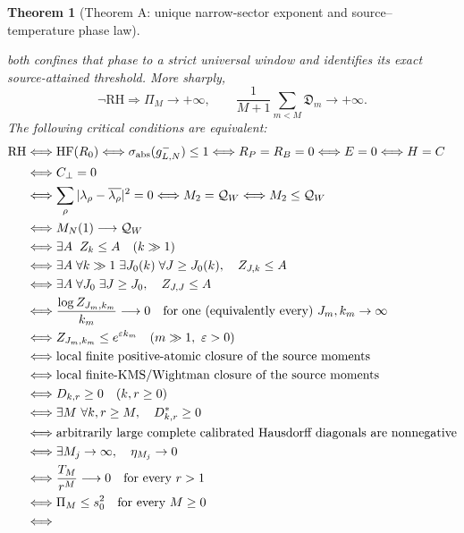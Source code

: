 \documentclass[11pt]{article}
\newtheorem{theorem}{Theorem}[section]
\begin{document}
\begin{theorem}[Theorem A: unique narrow-sector exponent and source--temperature phase law]
\begin{enumerate}[label=\textup{(\roman*)}]
both confines that phase to a strict universal window and identifies its exact source-attained
threshold.  More sharply,
\[
 \neg\mathrm{RH}\Longrightarrow
 \Pi_M\longrightarrow+\infty,
 \qquad
 \frac1{M+1}\sum_{m<M}\mathfrak D_m\longrightarrow+\infty.
 \tag{1.20zb}
\]
The following critical conditions are equivalent:
\[
 \begin{aligned}
 \mathrm{RH}
 &\Longleftrightarrow \mathrm{HF}(R_0)
 \Longleftrightarrow \sigma_{\rm abs}(g_{L,N}^-)\le1
 \Longleftrightarrow R_P=R_B=0
 \Longleftrightarrow E=0
 \Longleftrightarrow H=C\\
 &\Longleftrightarrow C_\perp=0\\
 &\Longleftrightarrow
 \sum_\rho|\lambda_\rho-\overline{\lambda_\rho}|^2=0
 \Longleftrightarrow M_2=\mathcal Q_W
 \Longleftrightarrow M_2\le\mathcal Q_W\\
 &\Longleftrightarrow M_N(1)\longrightarrow\mathcal Q_W\\
 &\Longleftrightarrow \exists A\;\; Z_k\le A\quad(k\gg1)\\
 &\Longleftrightarrow
 \exists A\;\forall k\gg1\;\exists J_0(k)\;\forall J\ge J_0(k),\quad Z_{J,k}\le A\\
 &\Longleftrightarrow
 \exists A\;\forall J_0\;\exists J\ge J_0,\quad Z_{J,J}\le A\\
 &\Longleftrightarrow
 \frac{\log Z_{J_m,k_m}}{k_m}\longrightarrow0
 \quad\text{for one (equivalently every) }J_m,k_m\to\infty\\
 &\Longleftrightarrow
 Z_{J_m,k_m}\le e^{\varepsilon k_m}
 \quad(m\gg1,\ \varepsilon>0)\\
 &\Longleftrightarrow
 \text{local finite positive-atomic closure of the source moments}\\
 &\Longleftrightarrow
 \text{local finite-KMS/Wightman closure of the source moments}\\
 &\Longleftrightarrow D_{k,r}\ge0\quad(k,r\ge0)\\
 &\Longleftrightarrow
 \exists M\ \forall k,r\ge M,\quad D^*_{k,r}\ge0\\
 &\Longleftrightarrow
 \text{arbitrarily large complete calibrated Hausdorff diagonals are nonnegative}\\
 &\Longleftrightarrow
 \exists M_j\to\infty,\quad\eta_{M_j}\to0\\
 &\Longleftrightarrow
 \frac{T_M}{r^M}\longrightarrow0\quad\text{for every }r>1\\
 &\Longleftrightarrow
 \Pi_M\le s_0^2\quad\text{for every }M\ge0\\
 &\Longleftrightarrow

\end{aligned}\]
\end{enumerate}
\end{theorem}
\end{document}
